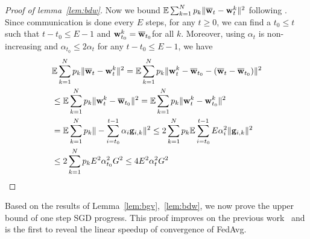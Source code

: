 \begin{proof}[Proof of lemma~\ref{lem:bdw}]
	Now we bound $\mathbb{E}\sum_{k=1}^{N}p_{k}\|{\overline{\mathbf{w}}}_{t}-{\mathbf{w}}_{t}^{k}\|^{2}$ following \cite{li2019convergence}.
	Since communication is done every $E$ steps, for any $t\geq0$, we
	can find a $t_{0}\leq t$ such that $t-t_{0}\leq E-1$ and ${\mathbf{w}}_{t_{0}}^{k}={\overline{\mathbf{w}}}_{t_{0}}$for
	all $k$. Moreover, using $\alpha_{t}$ is non-increasing and $\alpha_{t_{0}}\leq2\alpha{}_{t}$
	for any $t-t_{0}\leq E-1$, we have 
		\begin{align*}
	& \mathbb{E}\sum_{k=1}^{N}p_{k}\|{\overline{\mathbf{w}}}_{t}-{\mathbf{w}}_{t}^{k}\|^{2}
= \mathbb{E}\sum_{k=1}^{N}p_{k}\|{\mathbf{w}}_{t}^{k}-{\overline{\mathbf{w}}}_{t_{0}}-({\overline{\mathbf{w}}}_{t}-{\overline{\mathbf{w}}}_{t_{0}})\|^{2}\\
&\leq \mathbb{E}\sum_{k=1}^{N}p_{k}\|{\mathbf{w}}_{t}^{k}-{\overline{\mathbf{w}}}_{t_{0}}\|^{2}
= \mathbb{E}\sum_{k=1}^{N}p_{k}\|{\mathbf{w}}_{t}^{k}-{\mathbf{w}}_{t_{0}}^{k}\|^{2}\\
	&= \mathbb{E}\sum_{k=1}^{N}p_{k}\|-\sum_{i=t_{0}}^{t-1}\alpha_{i}{\mathbf{g}}_{i,k}\|^{2}
	\leq  2\sum_{k=1}^{N}p_{k}\mathbb{E}\sum_{i=t_{0}}^{t-1}E\alpha_{i}^{2}\|{\mathbf{g}}_{i,k}\|^{2}\\
	&\leq  2\sum_{k=1}^{N}p_{k}E^{2}\alpha_{t_{0}}^{2}G^{2}
	\leq  4E^{2}\alpha_{t}^{2}G^{2}
	\end{align*}
\end{proof}
Based on the results of Lemma~\ref{lem:bgv},~\ref{lem:bdw}, we now prove the upper bound of one step SGD progress. This 
proof improves on the previous work~\cite{li2019convergence} and is the first to reveal the linear speedup of convergence of FedAvg. 
